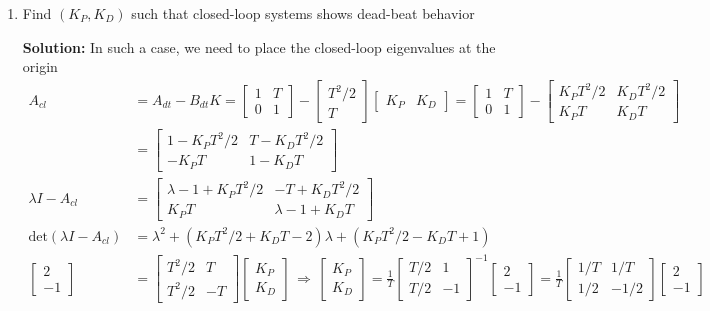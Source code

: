 \documentclass[twoside]{article}
\begin{document}
\begin{enumerate}
\item Find $(K_P,K_D)$ such that closed-loop systems shows dead-beat behavior

\textbf{Solution:} In such a case, we need to place the closed-loop eigenvalues at the origin 
%
\begin{align*}
	A_{cl} &= A_{dt} - B_{dt} K =  \begin{bmatrix} 1 & T \\ 0 & 1 \end{bmatrix} - \begin{bmatrix} T^2/2 \\ T \end{bmatrix} 
	\begin{bmatrix} K_P & K_D \end{bmatrix} 
	=  \begin{bmatrix} 1 & T \\ 0 & 1 \end{bmatrix} -  \begin{bmatrix} K_P T^2/2  & K_D T^2/2 \\ K_P T & K_D T \end{bmatrix}  
	\\
	&=  \begin{bmatrix} 1 - K_P T^2/2  & T - K_D T^2/2 \\ - K_P T & 1 - K_D T \end{bmatrix}
	\\
	\lambda I - A_{cl} &= \begin{bmatrix} \lambda - 1 + K_P T^2/2  & - T + K_D T^2/2 \\  K_P T & \lambda -  1+ K_D T \end{bmatrix}
	\\
	\mathrm{det}\left( \lambda I - A_{cl} \right) &= \lambda^2 + \left( K_P T^2/2 + K_D T - 2 \right) \lambda + \left( K_P T^2/2 - K_D T + 1 \right)
	\\
	\begin{bmatrix} 2 \\ -1 \end{bmatrix} 
	&= \begin{bmatrix} T^2/2 & T \\ T^2/2 & -T \end{bmatrix} \begin{bmatrix} K_P \\ K_D \end{bmatrix} 
	\, \Rightarrow \, \begin{bmatrix} K_P \\ K_D \end{bmatrix} = \frac{1}{T} \begin{bmatrix} T/2 & 1 \\ T/2 & -1 \end{bmatrix}^{-1}  \begin{bmatrix} 2 \\ -1 \end{bmatrix} =  \frac{1}{T} \begin{bmatrix} 1/T & 1/T \\ 1/2 & -1/2 \end{bmatrix} \begin{bmatrix} 2 \\ -1 \end{bmatrix} 

\end{align*}
\end{enumerate}
\end{document}
